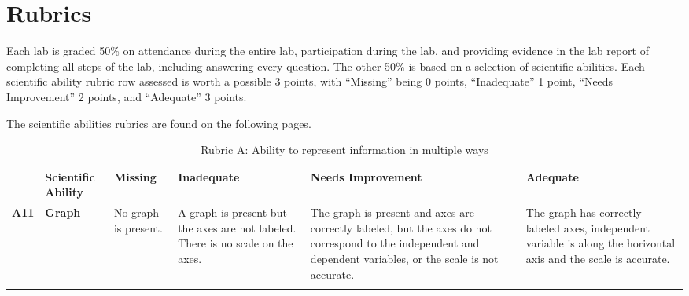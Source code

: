 
\chapter{Rubrics}\label{cha:rubrics}

Each lab is graded 50\% on attendance during the entire lab, participation during the lab, and providing evidence in the lab report of completing all steps of the lab, including answering every question. The other 50\% is based on a selection of scientific abilities. Each scientific ability rubric row assessed is worth a possible 3 points, with ``Missing'' being 0 points, ``Inadequate'' 1 point, ``Needs Improvement'' 2 points, and ``Adequate'' 3 points.

The scientific abilities rubrics are found on the following pages.

\begin{landscape}

\begin{longtable}{>{\bfseries}p{0.04\textheight}|>{\bfseries\RaggedRight}p{0.23\textheight}|>{\RaggedRight}p{0.21\textheight}|>{\RaggedRight}p{0.21\textheight}|>{\RaggedRight}p{0.22\textheight}|>{\RaggedRight}p{0.22\textheight}}
	\toprule
	& Scientific Ability
	& Missing & Inadequate & Needs Improvement & Adequate \\ \midrule \endhead
	A11
	& Graph
	& No graph is present.
	& A graph is present but the axes are not labeled. There is no scale on the axes.
	& The graph is present and axes are correctly labeled, but the axes do not correspond to the independent and dependent variables, or the scale is not accurate.
	& The graph has correctly labeled axes, independent variable is along the horizontal axis and the scale is accurate.
	\\
	\bottomrule
	\caption{Rubric A: Ability to represent information in multiple ways}\label{rubric:a}
	\end{longtable}


\end{landscape}
